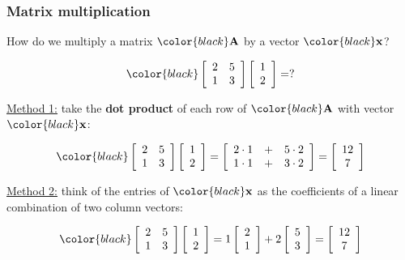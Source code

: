 \documentclass[compress]{beamer}
\newcommand{\black}[1]{{\color{black}#1}}
\renewcommand{\emph}[1]{\textbf{\black{#1}}}
\newcommand{\beq}[1]{\[\black{#1}\]}
\begin{document}
\begin{frame}
\frametitle{Matrix multiplication}

How do we multiply a matrix $\black{\A}$ by a vector $\black{\x}$?

\beq{
\left[
\begin{array}{rr}
2 & 5\\
1 & 3
\end{array}
\right]
\left[
\begin{array}{r}
1\\
2
\end{array}
\right]=?
}

\underline{Method 1:} take the \emph{dot product} of each row of $\black{\A}$ with vector $\black{\x}$:

\beq{
\left[
\begin{array}{rr}
2 & 5\\
1 & 3
\end{array}
\right]
\left[
\begin{array}{r}
1\\
2
\end{array}
\right]=
\left[
\begin{array}{ccc}
2\cdot 1 &+& 5\cdot 2\\
1\cdot 1 &+& 3\cdot 2
\end{array}
\right]=
\left[
\begin{array}{c}
12\\
7
\end{array}
\right]
}

\underline{Method 2:} think of the entries of $\black{\x}$ as the coefficients of a linear combination of two column vectors:

\beq{
\left[
\begin{array}{rr}
2 & 5\\
1 & 3
\end{array}
\right]
\left[
\begin{array}{r}
1\\
2
\end{array}
\right]=
1\left[
\begin{array}{c}
2\\
1
\end{array}
\right]+
2\left[
\begin{array}{c}
5\\
3
\end{array}
\right]=
\left[
\begin{array}{c}
12\\
7
\end{array}
\right]
}


\end{frame}
\end{document}
